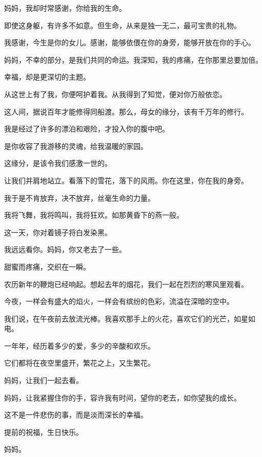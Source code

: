 		\vspace{1em}
		妈妈，我却时常感谢，你给我的生命。\par
		即使这身躯，有许多不如意。但生命，从来是独一无二，最可宝贵的礼物。\par
		我感谢，今生是你的女儿。感谢，能够依偎在你的身旁，能够开放在你的手心。\par
		妈妈，不幸的部分，是我们共同的命运。我深知，我的疼痛，在你那里总要加倍。\par
		幸福，却是更深切的主题。\par
		从这世上有了我，你便呵护着我。从我得到了知觉，便对你万般依恋。\par
		这人间，据说百年才能修得同船渡。那么，母女的缘分，该有千万年的修行。\par
		我是经过了许多的漂泊和艰险，才投入你的腹中吧。\par
		是你收容了我游移的灵魂，给我温暖的家园。\par
		这缘分，是该令我们感激一世的。\par
		让我们并肩地站立。看落下的雪花，落下的风雨。你在这里，你在我的身旁。\par
		我于是不肯放弃，决不放弃，丝毫生命的力量。\par
		我将飞舞，我将鸣叫，我将狂欢。如那黄昏下的燕一般。

		\vspace{1em}
		这一天，你对着镜子将白发染黑。\par
		我远远看你。妈妈，你又老去了一些。\par
		甜蜜而疼痛，交织在一瞬。\par
		农历新年的鞭炮已经响起。想起去年的烟花，我们一起在烈烈的寒风里观看。\par
		今夜，一样会有盛大的焰火，一样会有缤纷的色彩，流溢在深暗的空中。\par
		我们说，在午夜前去放流光棒。我喜欢那手上的火花，喜欢它们的光芒，如星如电。\par
		一年年，经历着多少的爱，多少的辛酸和欢乐。\par
		它们都将在夜空里盛开，繁花之上，又生繁花。\par
		妈妈，让我们一起去看。\par
		妈妈，让我紧握住你的手，容许我有时间，望你的老去，如你望我的成长。\par
		这不是一件悲伤的事，而是淡而深长的幸福。

		\vspace{1em}
		提前的祝福，生日快乐。

		妈妈。

	\endwriting


